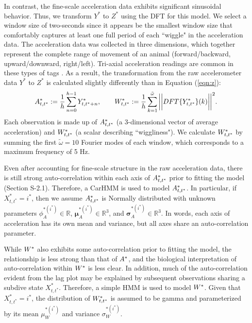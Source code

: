 In contrast, the fine-scale acceleration data exhibits significant sinusoidal behavior. Thus, we transform $Y^*$ to $Z^*$ using the DFT for this model. We select a window size of two-seconds since it appears be the smallest window size that comfortably captures at least one full period of each ``wiggle" in the acceleration data. The acceleration data was collected in three dimensions, which together represent the complete range of movement of an animal (forward/backward, upward/downward, right/left). Tri-axial acceleration readings are common in these types of tags \citep{Cade:2017,Fehlmann:2017,Wright:2017}. As a result, the transformation from the raw accelerometer data $Y^*$ to $Z^*$ is calculated slightly differently than in Equation (\ref{eqn:z}):
%
\begin{equation*}
    \Zone_{t,t^*} := \frac{1}{h}\sum_{n=0}^{h-1}Y^*_{t,t^*+n}, \qquad \Ztwo_{t,t^*} := \frac{1}{h}\sum_{k=1}^{\tilde{\omega}}\bigg|\bigg|DFT\{Y^*_{t,t^*}\}(k)\bigg|\bigg|^2.
\end{equation*}
%
Each observation is made up of $A^*_{t,t^*}$ (a 3-dimensional vector of average acceleration) and $W^*_{t,t^*}$ (a scalar describing ``wiggliness"). We calculate $W^*_{t,t^*}$ by summing the first $\tilde \omega = 10$ Fourier modes of each window, which corresponds to a maximum frequency of 5 Hz. 

Even after accounting for fine-scale structure in the raw acceleration data, there is still strong auto-correlation within each axis of $A^*_{t,t^*}$ prior to fitting the model (Section S-2.1). Therefore, a CarHMM is used to model $A^*_{t,t^*}$. In particular, if $X^*_{t,t^*} = i^*$, then we assume $A^*_{t,t^*}$ is Normally distributed with unknown parameters $\phi_A^{*(i^*)} \in \mathbb{R}$, $\mathbf{\mu}_A^{*(i^*)} \in \mathbb{R}^3$, and $\mathbf{\sigma}_A^{*(i^*)} \in \mathbb{R}^3$. In words, each axis of acceleration has its own mean and variance, but all axes share an auto-correlation parameter.
%
%

While $W^*$ also exhibits some auto-correlation prior to fitting the model, the relationship is less strong than that of $A^*$, and the biological interpretation of auto-correlation within $W^*$ is less clear. In addition, much of the auto-correlation evident from the lag plot may be explained by subsequent observations sharing a subdive state $X^*_{t,t^*}$. Therefore, a simple HMM is used to model $W^*$. Given that $X^*_{t,t^*} = i^*$, the distribution of $W^*_{t,t^*}$ is assumed to be gamma and parameterized by its mean $\mu_W^{*(i^*)}$ and variance $\sigma_W^{*(i^*)}$.
%
%


